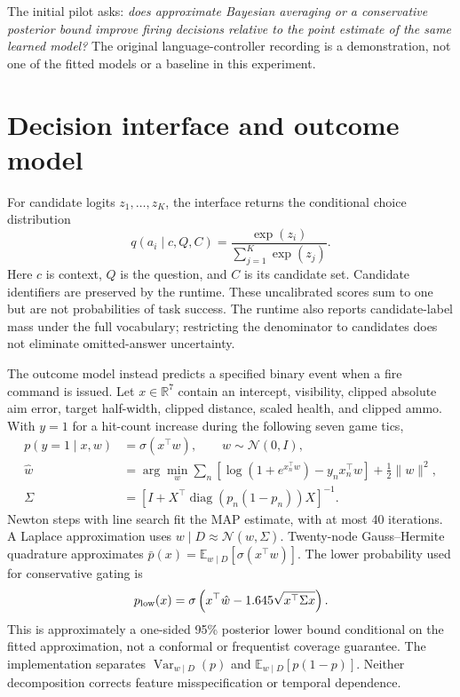 \documentclass[11pt]{article}
\begin{document}
The initial pilot asks: \emph{does approximate Bayesian averaging or a conservative posterior bound improve firing decisions relative to the point estimate of the same learned model?} The original language-controller recording is a demonstration, not one of the fitted models or a baseline in this experiment.

\section{Decision interface and outcome model}
For candidate logits $z_1,\ldots,z_K$, the interface returns the conditional choice distribution
\begin{equation}
 q(a_i\mid c,Q,C)=\frac{\exp(z_i)}{\sum_{j=1}^{K}\exp(z_j)}.
\end{equation}
Here $c$ is context, $Q$ is the question, and $C$ is its candidate set. Candidate identifiers are preserved by the runtime. These uncalibrated scores sum to one but are not probabilities of task success. The runtime also reports candidate-label mass under the full vocabulary; restricting the denominator to candidates does not eliminate omitted-answer uncertainty.

The outcome model instead predicts a specified binary event when a fire command is issued. Let $x\in\mathbb{R}^7$ contain an intercept, visibility, clipped absolute aim error, target half-width, clipped distance, scaled health, and clipped ammo. With $y=1$ for a hit-count increase during the following seven game tics,
\begin{align}
 p(y=1\mid x,w)&=\sigma(x^\top w),\qquad w\sim\mathcal{N}(0,I),\\
 \hat w&=\arg\min_w\sum_n\left[\log(1+e^{x_n^\top w})-y_nx_n^\top w\right]+\tfrac12\lVert w\rVert^2,\\
 \Sigma&=\left[I+X^\top\operatorname{diag}(p_n(1-p_n))X\right]^{-1}.
\end{align}
Newton steps with line search fit the MAP estimate, with at most 40 iterations. A Laplace approximation uses $w\mid D\approx\mathcal{N}(\hat w,\Sigma)$. Twenty-node Gauss--Hermite quadrature approximates $\bar p(x)=\mathbb{E}_{w\mid D}[\sigma(x^\top w)]$. The lower probability used for conservative gating is
\begin{equation}
 p_{\rm low}(x)=\sigma\left(x^\top\hat w-1.645\sqrt{x^\top\Sigma x}\right).
\end{equation}
This is approximately a one-sided 95\% posterior lower bound conditional on the fitted approximation, not a conformal or frequentist coverage guarantee. The implementation separates $\operatorname{Var}_{w\mid D}(p)$ and $\mathbb{E}_{w\mid D}[p(1-p)]$. Neither decomposition corrects feature misspecification or temporal dependence.
\end{document}
